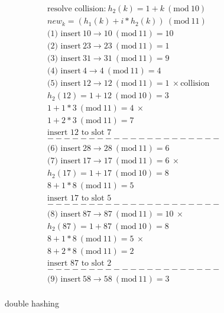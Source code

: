 \documentclass[a4paper]{article}
\newcommand{\Mod}[1]{\ (\mathrm{mod}\ #1)}
\begin{document}
\begin{minipage}{8cm}
\begin{align*}
  &\text{resolve collision:}\ h_2(k) = 1 + k \Mod{10} \\
  & new_k = (h_1(k) + i * h_2(k)) \Mod{11}\\
  &\text{(1) insert}\ 10 \to 10 \Mod{11} = 10\\
  &\text{(2) insert}\ 23 \to 23 \Mod{11} = 1\\
  &\text{(3) insert}\ 31 \to 31 \Mod{11} = 9\\
  &\text{(4) insert}\ 4 \to 4 \Mod{11} = 4\\
  &\text{(5) insert}\ 12 \to  12 \Mod{11} = 1\ \times\text{collision} \\
  & h_2(12) = 1 + 12 \Mod{10} = 3\\
  & 1 + 1 * 3 \Mod{11} = 4\ \times \\
  & 1 + 2 * 3 \Mod{11} = 7\ \\
  &\text{insert $12$ to slot $7$}\\
  &---------------------\\
  &\text{(6) insert}\ 28\to 28\Mod{11} = 6\\
  &\text{(7) insert}\ 17\to 17\Mod{11} = 6\ \times \\
  & h_2(17) = 1 + 17 \Mod{10} = 8\\
  & 8 + 1 * 8 \Mod{11} = 5\\
  &\text{insert $17$ to slot $5$}\\
  &---------------------\\
  &\text{(8) insert}\ 87\to 87\Mod{11} = 10\ \times \\
  & h_2(87) = 1 + 87 \Mod{10} = 8\\
  & 8 + 1 * 8 \Mod{11} = 5\ \times \\
  & 8 + 2 * 8 \Mod{11} = 2\\
  &\text{insert $87$ to slot $2$}\\
  &---------------------\\
  &\text{(9) insert}\ 58\to 58\Mod{11} = 3\\
\end{align*}
\end{minipage}
\qquad
\begin{minipage}{5cm}
\begin{figure}[H]
\centering
{}
\caption{double hashing}
\end{figure}
\end{minipage}
\end{document}
